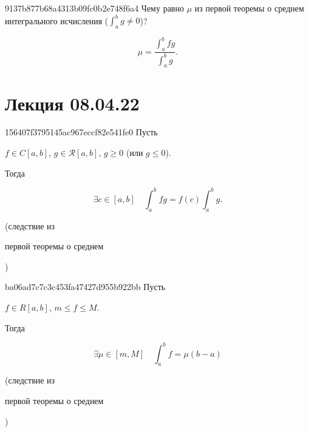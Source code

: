 \begin{note}{9137b877b68a4313b09fc0b2e748f6a4}
    Чему равно \({ \mu }\) из первой теоремы о среднем интегрального исчисления (\({ \int_{a}^{b} g \neq 0 }\))?

    \begin{cloze}{1}
        \[
            \mu = \frac{\int_{a}^{b} fg}{\int_{a}^{b} g}.
        \]
    \end{cloze}
\end{note}

\section{Лекция 08.04.22}
\begin{note}{156407f3795145ac967eccf82e541fe0}
    Пусть \begin{icloze}{2}\({ f \in C[a, b] }\), \({ g \in \mathcal R[a, b] }\), \({ g \geqslant 0 }\) (или \({ g \leqslant 0 }\)).\end{icloze}
    Тогда
    \begin{icloze}{1}
        \[
            \exists c \in [a, b] \quad \int_{a}^{b} fg = f(c) \int_{a}^{b} g.
        \]
    \end{icloze}

    \begin{center}
        \tiny
        (следствие из \begin{icloze}{3}первой теоремы о среднем\end{icloze})
    \end{center}
\end{note}

\begin{note}{ba06ad7c7c3c453fa47427d955b922bb}
    Пусть \begin{icloze}{2}\({ f \in R[a, b] }\), \({ m \leqslant f \leqslant M }\).\end{icloze}
    Тогда
    \begin{icloze}{1}
        \[
            \exists \mu \in [m, M] \quad \int_{a}^{b} f = \mu(b - a)
        \]
    \end{icloze}

    \begin{center}
        \tiny
        (следствие из \begin{icloze}{3}первой теоремы о среднем\end{icloze})
    \end{center}
\end{note}

